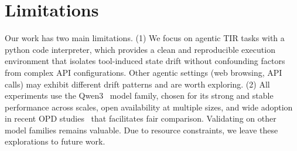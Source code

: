 \section{Limitations}
\label{sec:limitations}






Our work has two main limitations. (1) We focus on agentic TIR tasks with a python code interpreter, which provides a clean and reproducible execution environment that isolates tool-induced state drift without confounding factors from complex API configurations. Other agentic settings (\eg web browsing, API calls) may exhibit different drift patterns and are worth exploring. (2) All experiments use the Qwen3~\citep{qwen2025qwen3} model family, chosen for its strong and stable performance across scales, open availability at multiple sizes, and wide adoption in recent OPD studies~\citep{opsd,tip,eopd,li2026rethinking} that facilitates fair comparison. Validating on other model families remains valuable. Due to resource constraints, we leave these explorations to future work.
